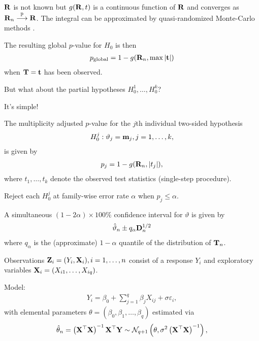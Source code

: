 \documentclass[landscape]{slides}
\begin{document}
$\mathbf{R}$ is not known but $g(\mathbf{R}, t)$ is a continuous function of $\mathbf{R}$ 
and converges as $\mathbf{R}_n \stackrel{\mathbb{P}}{\longrightarrow} \mathbf{R}$. The integral can be approximated
by quasi-randomized Monte-Carlo methods \citep{Genz1992,GenzBretz1999}.

The resulting global $p$-value 
for $H_0$ is then 
\begin{eqnarray*}
p_\text{global} = 1 - g(\mathbf{R}_n, \max|\mathbf{t}|)
\end{eqnarray*}
when $\mathbf{T} = \mathbf{t}$ has been observed.


But what about the partial hypotheses $H_0^1, \ldots, H_0^k$?

It's simple!

The multiplicity adjusted $p$-value for the $j$th
individual two-sided hypothesis 
\begin{eqnarray*}
H_0^j: \vartheta_j = \mathbf{m}_j, j = 1, \dots, k,
\end{eqnarray*}
is given by 
\begin{eqnarray*}
p_j = 1 - g(\mathbf{R}_n, |t_j|),
\end{eqnarray*}
where $t_1, \dots, t_k$ denote the observed test statistics (single-step procedure).

Reject each $H_0^j$ at family-wise error rate $\alpha$ when $p_j \leq \alpha$.


A simultaneous $(1 - 2\alpha)
\times 100\%$ confidence interval for $\vartheta$ is given by 
\begin{eqnarray*}
\hat{\vartheta}_n \pm q_\alpha \mathbf{D}_n^{1/2}
\end{eqnarray*}
where $q_\alpha$ is the (approximate) $1 - \alpha$ quantile of the distribution of $\mathbf{T}_n$.


Observations $\mathbf{Z}_i = (Y_i, \mathbf{X}_i), i = 1, \dots, n$ consist of a response $Y_i$
and exploratory variables $\mathbf{X}_i = (X_{i1}, \dots, X_{iq})$.

Model:
\begin{eqnarray*}
Y_i = \beta_0 + \sum_{j = 1}^q \beta_j X_{ij} + \sigma \varepsilon_i,
\end{eqnarray*}
with elemental parameters $\theta = (\beta_0, \beta_1, \dots, \beta_q)$
estimated via
\begin{eqnarray*}
\hat{\theta}_n = \left(\X^\top\X\right)^{-1} \X^\top \Y \sim \N%
_{q+1}\left(\theta, \sigma^2 \left(\X^\top\X\right)^{-1}\right),
\end{eqnarray*}
\end{document}
